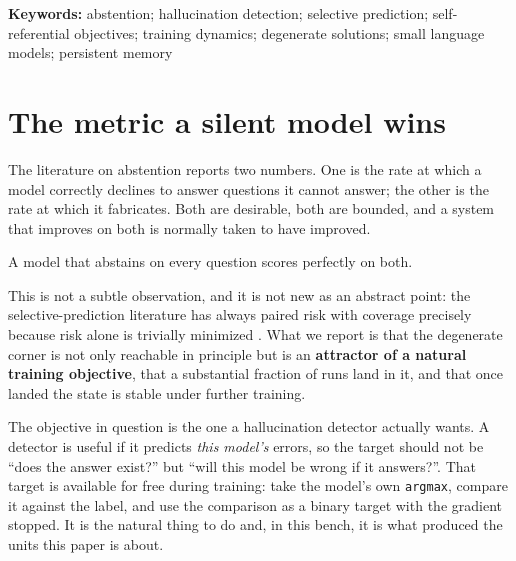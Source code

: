 \documentclass[11pt,a4paper]{article}
\begin{document}
\begin{abstract}
The degenerate point is \textbf{absorbing}, not merely slow. Measuring recovery inside one unit with
paired samples across $4000$ further steps gives $-0.0021$, or $0.4\sigma$: it does not move. We
also report a correction to our own first reading, in which a between-unit trend that survives a
noise control ($r = 0.986$) was nonetheless not extrapolable, because the curve is concave and a
linear fit hid a saturation.

The practical consequence is a metric claim, not an architectural one: \textbf{any success criterion
that reads abstention rate and fabrication rate without reading global accuracy is maximized by a
model that has learned nothing}, and a self-referential objective supplies a training dynamic that
reaches that maximum on its own, in a substantial fraction of runs, with no warning from either
metric.
\end{abstract}

\vspace{0.5em}
\noindent\textbf{Keywords:} abstention; hallucination detection; selective prediction; self-referential
objectives; training dynamics; degenerate solutions; small language models; persistent memory

\section{The metric a silent model wins}
\label{sec:intro}

The literature on abstention reports two numbers. One is the rate at which a model correctly declines
to answer questions it cannot answer; the other is the rate at which it fabricates. Both are
desirable, both are bounded, and a system that improves on both is normally taken to have improved.

A model that abstains on every question scores perfectly on both.

This is not a subtle observation, and it is not new as an abstract point: the selective-prediction
literature has always paired risk with coverage precisely because risk alone is trivially minimized
\citep{elyaniv2010selective, geifman2017selective}. What we report is that the degenerate corner is
not only reachable in principle but is an \textbf{attractor of a natural training objective}, that a
substantial fraction of runs land in it, and that once landed the state is stable under further
training.

The objective in question is the one a hallucination detector actually wants. A detector is useful if
it predicts \emph{this model's} errors, so the target should not be ``does the answer exist?'' but
``will this model be wrong if it answers?''. That target is available for free during training: take
the model's own \texttt{argmax}, compare it against the label, and use the comparison as a binary
target with the gradient stopped. It is the natural thing to do and, in this bench, it is what
produced the units this paper is about.
\end{document}
